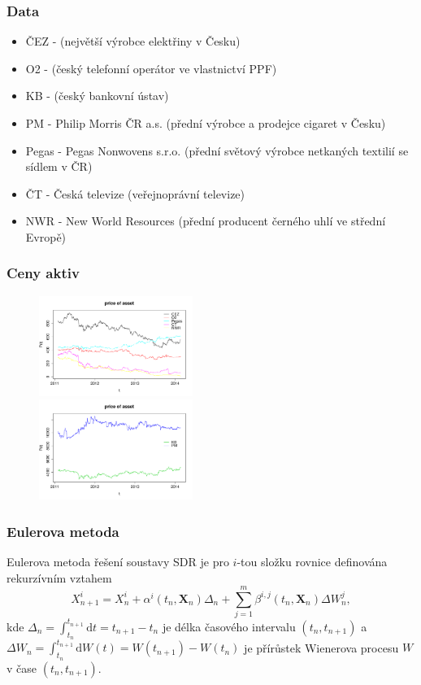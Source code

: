 \documentclass[xcolor=dvipsnames]{beamer}
\theoremstyle{definition} \newtheorem{definice}[veta]{Definice}
\theoremstyle{remark}
\begin{document}
\begin{frame}
  \frametitle{Data}
    \begin{itemize}
    \item ČEZ -  {\scriptsize(největší výrobce elektřiny v Česku)}
    \item O2 -  {\scriptsize(český telefonní operátor ve vlastnictví PPF)}
    \item KB -  {\scriptsize(český bankovní ústav)}
    \item PM - Philip Morris ČR a.s. {\scriptsize(přední výrobce a prodejce cigaret v Česku)}
    \item Pegas - Pegas Nonwovens s.r.o. {\scriptsize(přední světový výrobce netkaných textilií se sídlem v ČR)}
    \item ČT -  Česká televize {\scriptsize(veřejnoprávní televize)}
    \item NWR -  New World Resources {\scriptsize(přední producent černého uhlí ve střední Evropě)}
    \end{itemize}
\end{frame}

\begin{frame}
  \frametitle{Ceny aktiv}
 \begin{figure}[!htbp]
  \centering 
	\includegraphics[width=5cm, clip, trim= 0 15 25 50]{IMG/data_price_of_asset_ostatni.pdf}\\[5mm]
	\includegraphics[width=5cm, clip, trim= 0 15 25 50]{IMG/data_price_of_asset_KBPM_v2.pdf}	
\end{figure} 
\end{frame}


\begin{frame}
  \frametitle{Eulerova metoda}
  Eulerova metoda řešení soustavy SDR je pro $i$-tou složku rovnice definována rekurzívním vztahem
\begin{equation}
X_{n+1}^i=X_n^i+\alpha^i(t_n,\boldsymbol{X}_n)\Delta_n+\sum_{j=1}^m\beta^{i,j}(t_n,\boldsymbol{X}_n)\Delta W_n^j,
\end{equation}
kde $\Delta_n=\int_{t_n}^{t_{n+1}}\mathrm{d}t=t_{n+1}-t_n$ je délka časového intervalu $(t_n,t_{n+1})$
a $\Delta W_n=\int_{t_n}^{t_{n+1}}\mathrm{d}W(t)=W(t_{n+1})-W(t_n)$ je přírůstek Wienerova procesu $W$ v čase $(t_n,t_{n+1})$.
\end{frame}
\end{document}
